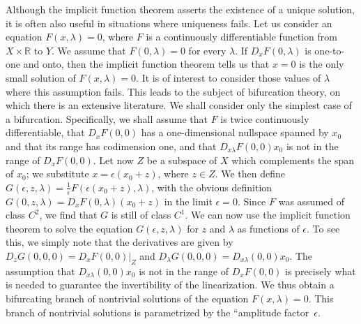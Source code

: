 Although the implicit function theorem asserts the existence of a unique solution, it is often also useful in situations where uniqueness fails. Let us consider an equation $F(x,\lambda)=0$, where $F$ is a continuously differentiable function from $X\times\mathbb{R}$ to $Y$. We assume that $F(0,\lambda)=0$ for every $\lambda$. If $D_xF(0,\lambda)$ is one-to-one and onto, then the implicit function theorem tells us that $x=0$ is the only small solution of $F(x,\lambda)=0$. It is of interest to consider those values of $\lambda$ where this assumption fails. This leads to the subject of bifurcation theory, on which there is an extensive literature. We shall consider only the simplest case of a bifurcation. Specifically, we shall assume that $F$ is twice continuously differentiable, that $D_xF(0,0)$ has a one-dimensional nullspace spanned by $x_0$ and that its range has codimension one, and that $D_{x\lambda}F(0,0)x_0$ is not in the range of $D_xF(0,0)$. Let now $Z$ be a subspace of $X$ which complements the span of $x_0$; we substitute $x=\epsilon(x_0+z)$, where $z\in Z$. We then define $G(\epsilon,z,\lambda)=\frac{1}{\epsilon}F(\epsilon(x_0+z),\lambda)$, with the obvious definition $G(0,z,\lambda)=D_xF(0,\lambda)(x_0+z)$ in the limit $\epsilon=0$. Since $F$ was assumed of class $C^2$, we find that $G$ is still of class $C^1$. We can now use the implicit function theorem to solve the equation $G(\epsilon,z,\lambda)$ for $z$ and $\lambda$ as functions of $\epsilon$. To see this, we simply note that the derivatives are given by $D_zG(0,0,0)=\left.D_xF(0,0)\right|_Z$ and $D_\lambda G(0,0,0)=D_{x\lambda}(0,0)x_0$. The assumption that $D_{x\lambda}(0,0)x_0$ is not in the range of $D_xF(0,0)$ is precisely what is needed to guarantee the invertibility of the linearization. We thus obtain a bifurcating branch of nontrivial solutions of the equation $F(x,\lambda)=0$. This branch of nontrivial solutions is parametrized by the ``amplitude factor\textquotesingle\textquotesingle\ $\epsilon$.
